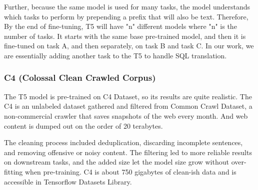 Further, because the same model is used for many tasks, the model understands which tasks to perform by prepending a prefix that will also be text.
Therefore, By the end of fine-tuning, T5 will have "n" different models where "n" is the number of tasks. It starts with the same base pre-trained model, and then it is fine-tuned on task A, and then separately, on task B and task C. In our work, we are essentially adding another task to the T5 to handle SQL translation.

\subsubsection*{C4 (Colossal Clean Crawled Corpus)}

The T5 model is pre-trained on C4 Dataset\cite{raffel_exploring_2020}, so its results are quite realistic.
The C4 is an unlabeled dataset gathered and filtered from Common Crawl Dataset, a non-commercial crawler that saves snapshots of the web every month. And web content is dumped out on the order of 20 terabytes.

The cleaning process included deduplication, discarding incomplete sentences, and removing offensive or noisy content. The filtering led to more reliable results on downstream tasks, and the added size let the model size grow without over-fitting when pre-training. C4 is about 750 gigabytes of clean-ish data and is accessible in Tensorflow Datasets Library.